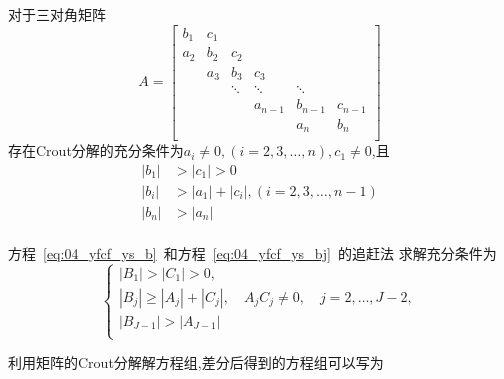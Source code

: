 \begin{Theorem}[Crout分解的充分条件]
对于三对角矩阵
\begin{equation*}
A=\begin{bmatrix}
   b_1 & c_1 \\
   a_2 & b_2 & c_2 \\
       & a_3 & b_3    & c_3 \\
       &     & \ddots & \ddots  & \ddots            \\
       &     &        & a_{n-1} & b_{n-1} & c_{n-1} \\
       &     &        &         &   a_n   & b_n     \\
  \end{bmatrix}
\end{equation*}
存在Crout分解的充分条件为$a_i\not=0,(i=2,3,\ldots,n),c_1\not=0$,且
\begin{equation*}
\begin{split}
|b_1|&>|c_1|>0 \\
|b_i|&>|a_1|+|c_i|,(i=2,3,\ldots,n-1) \\
|b_n|&>|a_n|   \\
\end{split}
\end{equation*}
\end{Theorem}\par
方程~\ref{eq:04_yfcf_ys_b}~和方程~\ref{eq:04_yfcf_ys_bj}~的追赶法
求解充分条件为
\begin{equation}
\begin{cases}
|B_1|>|C_1|>0,\\
|B_j|\geq |A_j|+|C_j|,\quad A_j C_j\not=0,\quad j=2,\ldots,J-2,\\
|B_{J-1}|>|A_{J-1}| \\
\end{cases}
\end{equation}\par
利用矩阵的Crout分解解方程组,差分后得到的方程组可以写为
